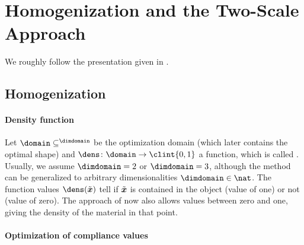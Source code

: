 \section{Homogenization and the Two-Scale Approach}
\label{sec:61homogenization}

We roughly follow the presentation given in
.

\subsection{Homogenization}
\label{sec:611homogenization}

\paragraph{Density function}

Let $\domain \subset \real^{\dimdomain}$ be the optimization domain
(which later contains the optimal shape) and
$\dens\colon \domain \to \clint{0, 1}$ a function,
which is called .
Usually, we assume $\dimdomain = 2$ or $\dimdomain = 3$,
although the method can be generalized to
arbitrary dimensionalities $\dimdomain \in \nat$.
The function values $\dens(\tilde{\*x})$ tell if $\tilde{{\boldsymbol{x}}}$
is contained in the object (value of one) or not (value of zero).
The approach of  now also allows values between
zero and one, giving the density of the material in that point.

\paragraph{Optimization of compliance values}

